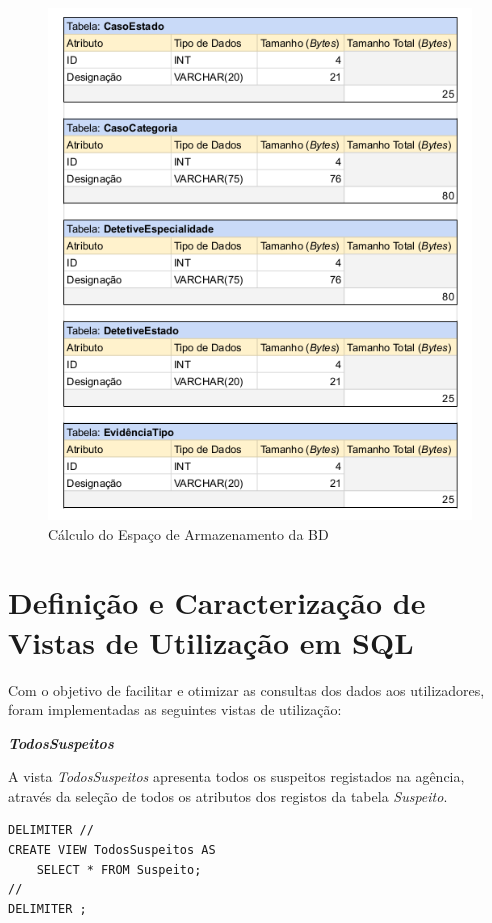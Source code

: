 \documentclass[a4paper,12pt]{scrreprt}
\begin{document}
\begin{figure}[!ht]
    \centering
    \includegraphics[scale=0.83]{images/armazenamento/5.png}
    \caption{Cálculo do Espaço de Armazenamento da BD}
    \label{fig:5.5}
\end{figure}

\clearpage

\section{Definição e Caracterização de Vistas de Utilização em SQL}

Com o objetivo de facilitar e otimizar as consultas dos dados aos utilizadores, foram implementadas as seguintes vistas de utilização:

\textit{\textbf{TodosSuspeitos}}

A vista \textit{TodosSuspeitos} apresenta todos os suspeitos registados na agência, através da seleção de todos os atributos dos registos da tabela \textit{Suspeito}.

\vspace{0.4cm}
\begin{lstlisting}
DELIMITER //
CREATE VIEW TodosSuspeitos AS
    SELECT * FROM Suspeito;
//
DELIMITER ;
\end{lstlisting}
\end{document}
